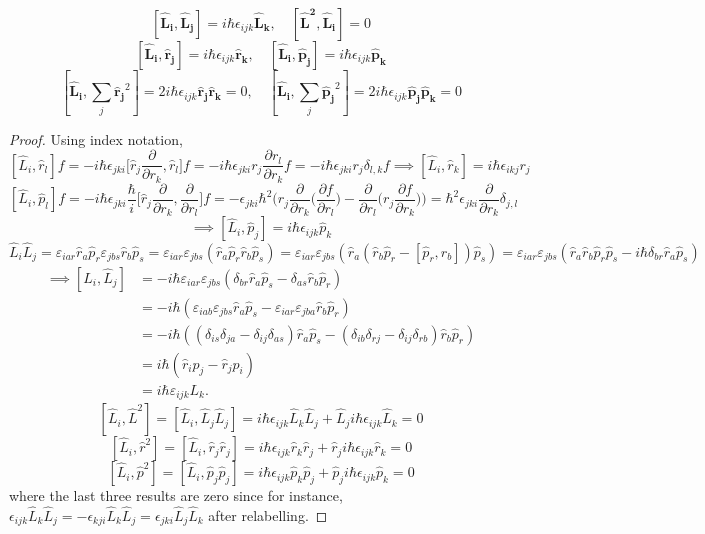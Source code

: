 \documentclass[a4paper]{article}
\begin{document}
\begin{thm}
$$[\mathbf{\hat{L}_i},\mathbf{\hat{L}_j}]=i\hbar\epsilon_{ijk}\mathbf{\hat{L}_k},\quad [\mathbf{\hat{L}^2},\mathbf{\hat{L}_i}]=0$$
$$[\mathbf{\hat{L}_i},\mathbf{\hat{r}_j}]=i\hbar\epsilon_{ijk}\mathbf{\hat{r}_k},\quad[\mathbf{\hat{L}_i},\mathbf{\hat{p}_j}]=i\hbar\epsilon_{ijk}\mathbf{\hat{p}_k}$$
$$[\mathbf{\hat{L}_i},\sum_j\mathbf{\hat{r}_j}^2]=2i\hbar\epsilon_{ijk}\mathbf{\hat{r}_j}\mathbf{\hat{r}_k}=0,\quad[\mathbf{\hat{L}_i},\sum_j\mathbf{\hat{p}_j}^2]=2i\hbar\epsilon_{ijk}\mathbf{\hat{p}_j}\mathbf{\hat{p}_k}=0$$
\end{thm}
\begin{proof}
Using index notation,
$$[\hat{L}_i,\hat{r}_l]f=-i\hbar\epsilon_{jki}\bigg[\hat{r}_j\frac{\partial}{\partial r_k},\hat{r}_l\bigg]f=-i\hbar\epsilon_{jki}r_j\frac{\partial r_l}{\partial r_k}f=-i\hbar\epsilon_{jki}r_j\delta_{l,k}f\implies[\hat{L}_i,\hat{r}_k]=i\hbar\epsilon_{ikj}r_j$$
$$[\hat{L}_i,\hat{p}_l]f=-i\hbar\epsilon_{jki}\frac{\hbar}{i}\bigg[\hat{r}_j\frac{\partial}{\partial r_k},\frac{\partial}{\partial r_l}\bigg]f=-\epsilon_{jki}\hbar^2\bigg(r_j\frac{\partial}{\partial r_k}\bigg(\frac{\partial f}{\partial r_l}\bigg)-\frac{\partial}{\partial r_l}\bigg(r_j\frac{\partial f}{\partial r_k}\bigg)\bigg)=\hbar^2\epsilon_{jki}\frac{\partial }{\partial r_k}\delta_{j,l}$$
$$\implies[\hat{L}_i,\hat{p}_j]=i\hbar\epsilon_{ijk}\hat{p}_k$$
$$\hat{L}_i \hat{L}_j= \varepsilon_{iar} \hat{r}_a \hat{p}_r \varepsilon_{jbs} \hat{r}_b \hat{p}_s= \varepsilon_{iar} \varepsilon_{jbs} (\hat{r}_a \hat{p}_r \hat{r}_b \hat{p}_s)= \varepsilon_{iar} \varepsilon_{jbs} (\hat{r}_a (\hat{r}_b \hat{p}_r - [\hat{p}_r, \hat{r}_b]) \hat{p}_s)= \varepsilon_{iar} \varepsilon_{jbs} (\hat{r}_a \hat{r}_b \hat{p}_r \hat{p}_s - i\hbar \delta_{br} \hat{r}_a \hat{p}_s)$$
 \begin{align*}
        \implies[\hat{L}_i,\hat{L}_j] &= -i\hbar \varepsilon_{iar} \varepsilon_{jbs}(\delta_{br} \hat{r}_a \hat{p}_s - \delta_{as}\hat{r}_b \hat{p}_r)\\
        &= -i\hbar (\varepsilon_{iab} \varepsilon_{jbs}\hat{r}_a \hat{p}_s - \varepsilon_{iar} \varepsilon_{jba} \hat{r}_b\hat{p}_r)\\
        &= -i\hbar ((\delta_{is} \delta_{ja} - \delta_{ij} \delta_{as})\hat{r}_a \hat{p}_s - (\delta_{ib} \delta_{rj} - \delta_{ij}\delta_{rb}) \hat{r}_b \hat{p}_r)\\
        &= i\hbar (\hat{r}_i p_j - \hat{r}_j p_i)\\
        &= i\hbar \varepsilon_{ijk} L_k.
      \end{align*}
$$[\hat{L}_i,\hat{L}^2]=[\hat{L}_i,\hat{L}_j\hat{L}_j]=i\hbar\epsilon_{ijk}\hat{L}_k\hat{L}_j+\hat{L}_ji\hbar\epsilon_{ijk}\hat{L}_k=0$$
$$[\hat{L}_i,\hat{r}^2]=[\hat{L}_i,\hat{r}_j\hat{r}_j]=i\hbar\epsilon_{ijk}\hat{r}_k\hat{r}_j+\hat{r}_ji\hbar\epsilon_{ijk}\hat{r}_k=0$$
$$[\hat{L}_i,\hat{p}^2]=[\hat{L}_i,\hat{p}_j\hat{p}_j]=i\hbar\epsilon_{ijk}\hat{p}_k\hat{p}_j+\hat{p}_ji\hbar\epsilon_{ijk}\hat{p}_k=0$$
where the last three results are zero since for instance,  $\epsilon_{ijk}\hat{L}_k\hat{L}_j=-\epsilon_{kji}\hat{L}_k\hat{L}_j=\epsilon_{jki}\hat{L}_j\hat{L}_k$ after relabelling.
\end{proof}
\end{document}
